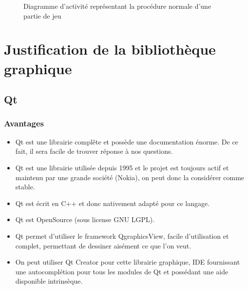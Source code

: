\documentclass[a4paper]{report}
\begin{document}
\begin{figure}[h]
    \caption{\label{3} Diagramme d'activité représentant la procédure normale d'une partie de jeu}
\end{figure}


\chapter{Justification de la bibliothèque graphique}
\section{Qt}
\subsection{Avantages}
\begin{itemize}
    \item Qt est une librairie complête et possède une documentation énorme. De ce fait, il sera facile de trouver réponse à nos questions.
    \item Qt est une librairie utilisée depuis 1995 et le projet est toujours actif et maintenu par une grande société (Nokia), on peut donc la considérer comme stable.
    \item Qt est écrit en C++ et donc nativement adapté pour ce langage.
    \item Qt est OpenSource (sous license GNU LGPL).
    \item Qt permet d'utiliser le framework QgraphicsView, facile d'utilisation et complet, permettant de dessiner aisément ce que l'on veut.
    \item On peut utiliser Qt Creator pour cette librairie graphique, IDE fournissant une autocomplétion pour tous les modules de Qt et possédant une aide disponible intrinsèque.
\end{itemize}
\end{document}
